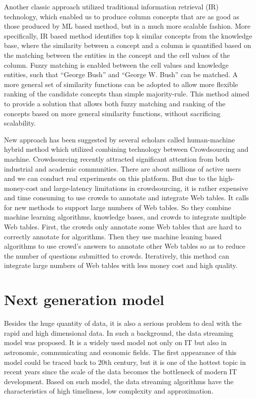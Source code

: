 \documentclass{article} %
\begin{document}
Another classic approach utilized traditional information retrieval (IR) technology, which enabled us to produce column concepts that are as good as those produced by ML based method, but in a much more scalable fashion. More specifically, IR based method identifies top k similar concepts from the knowledge base, where the similarity between a concept and a column is quantified based on the matching between the entities in the concept and the cell values of the column. Fuzzy matching is enabled between the cell values and knowledge entities, such that “George Bush” and “George W. Bush” can be matched. A more general set of similarity functions can be adopted to allow more flexible ranking of the candidate concepts than simple majority-rule. This method aimed to provide a solution that allows both fuzzy matching and ranking of the concepts based on more general similarity functions, without sacrificing scalability.

New approach has been suggested by several scholars called human-machine hybrid method which utilized combining technology between Crowdsourcing and machine. Crowdsourcing recently attracted significant attention from both industrial and academic communities. There are about millions of active users and we can conduct real experiments on this platform. But due to the high-money-cost and large-latency limitations in crowdsourcing, it is rather expensive and time consuming to use crowds to annotate and integrate Web tables. It calls for new methods to support large numbers of Web tables. So they combine machine learning algorithms, knowledge bases, and crowds to integrate multiple Web tables. First, the crowds only annotate some Web tables that are hard to correctly annotate for algorithms. Then they use machine leaning based algorithms to use crowd’s answers to annotate other Web tables so as to reduce the number of questions submitted to crowds. Iteratively, this method can integrate large numbers of Web tables with less money cost and high quality.

\section{Next generation model}
Besides the huge quantity of data, it is also a serious problem to deal with the rapid and high dimensional data. In such a background, the data streaming model was proposed. It is a widely used model not only on IT but also in astronomic, communicating and economic fields. The first appearance of this model could be traced back to 20th century, but it is one of the hottest topic in recent years since the scale of the data becomes the bottleneck of modern IT development. Based on such model, the data streaming algorithms have the characteristics of high timeliness, low complexity and approximation.
\end{document}
